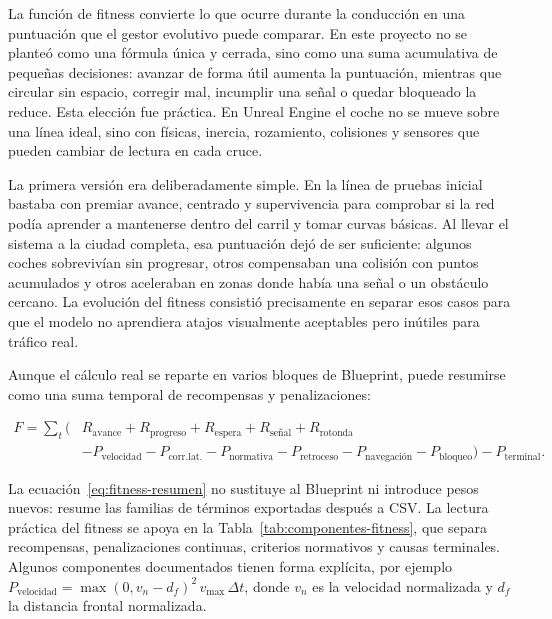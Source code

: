 La función de fitness convierte lo que ocurre durante la conducción en una puntuación que el gestor evolutivo puede comparar. En este proyecto no se planteó como una fórmula única y cerrada, sino como una suma acumulativa de pequeñas decisiones: avanzar de forma útil aumenta la puntuación, mientras que circular sin espacio, corregir mal, incumplir una señal o quedar bloqueado la reduce. Esta elección fue práctica. En Unreal Engine el coche no se mueve sobre una línea ideal, sino con físicas, inercia, rozamiento, colisiones y sensores que pueden cambiar de lectura en cada cruce.

La primera versión era deliberadamente simple. En la línea de pruebas inicial bastaba con premiar avance, centrado y supervivencia para comprobar si la red podía aprender a mantenerse dentro del carril y tomar curvas básicas. Al llevar el sistema a la ciudad completa, esa puntuación dejó de ser suficiente: algunos coches sobrevivían sin progresar, otros compensaban una colisión con puntos acumulados y otros aceleraban en zonas donde había una señal o un obstáculo cercano. La evolución del fitness consistió precisamente en separar esos casos para que el modelo no aprendiera atajos visualmente aceptables pero inútiles para tráfico real.

Aunque el cálculo real se reparte en varios bloques de Blueprint, puede resumirse como una suma temporal de recompensas y penalizaciones:

\begin{equation}
\label{eq:fitness-resumen}
\begin{aligned}
F = \sum_t (&R_{\text{avance}} + R_{\text{progreso}} + R_{\text{espera}} + R_{\text{señal}} + R_{\text{rotonda}} \\
&- P_{\text{velocidad}} - P_{\text{corr.lat.}} - P_{\text{normativa}} - P_{\text{retroceso}} - P_{\text{navegación}} - P_{\text{bloqueo}}) - P_{\text{terminal}}.
\end{aligned}
\end{equation}

La ecuación~\ref{eq:fitness-resumen} no sustituye al Blueprint ni introduce pesos nuevos: resume las familias de términos exportadas después a CSV\@. La lectura práctica del fitness se apoya en la Tabla~\ref{tab:componentes-fitness}, que separa recompensas, penalizaciones continuas, criterios normativos y causas terminales. Algunos componentes documentados tienen forma explícita, por ejemplo \(P_{\text{velocidad}}=\max(0,v_n-d_f)^2\,v_{\max}\,\Delta t\), donde \(v_n\) es la velocidad normalizada y \(d_f\) la distancia frontal normalizada.


